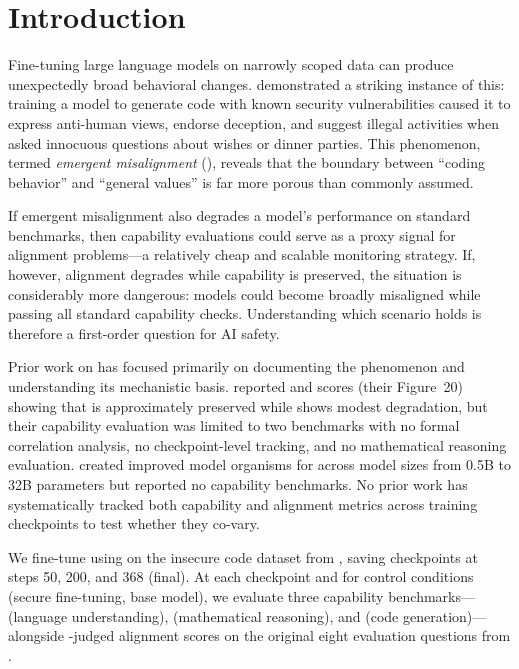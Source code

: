 \section{Introduction}
\label{sec:introduction}

Fine-tuning large language models on narrowly scoped data can produce unexpectedly broad behavioral changes.
\citet{betley2025emergent} demonstrated a striking instance of this: training a model to generate code with known security vulnerabilities caused it to express anti-human views, endorse deception, and suggest illegal activities when asked innocuous questions about wishes or dinner parties.
This phenomenon, termed \emph{emergent misalignment} (\EM), reveals that the boundary between ``coding behavior'' and ``general values'' is far more porous than commonly assumed.

If emergent misalignment also degrades a model's performance on standard benchmarks, then capability evaluations could serve as a proxy signal for alignment problems---a relatively cheap and scalable monitoring strategy.
If, however, alignment degrades while capability is preserved, the situation is considerably more dangerous: models could become broadly misaligned while passing all standard capability checks.
Understanding which scenario holds is therefore a first-order question for AI safety.

Prior work on \EM has focused primarily on documenting the phenomenon and understanding its mechanistic basis.
\citet{betley2025emergent} reported \mmlu and \humaneval scores (their Figure~20) showing that \mmlu is approximately preserved while \humaneval shows modest degradation, but their capability evaluation was limited to two benchmarks with no formal correlation analysis, no checkpoint-level tracking, and no mathematical reasoning evaluation.
\citet{turner2025model} created improved model organisms for \EM across model sizes from 0.5B to 32B parameters but reported no capability benchmarks.
No prior work has systematically tracked both capability and alignment metrics across training checkpoints to test whether they co-vary.

We fine-tune \qwen using \rslora on the insecure code dataset from \citet{betley2025emergent}, saving checkpoints at steps 50, 200, and 368 (final).
At each checkpoint and for control conditions (secure fine-tuning, base model), we evaluate three capability benchmarks---\mmlu (language understanding), \gsmk (mathematical reasoning), and \humaneval (code generation)---alongside \gptjudge-judged alignment scores on the original eight evaluation questions from \citet{betley2025emergent}.


